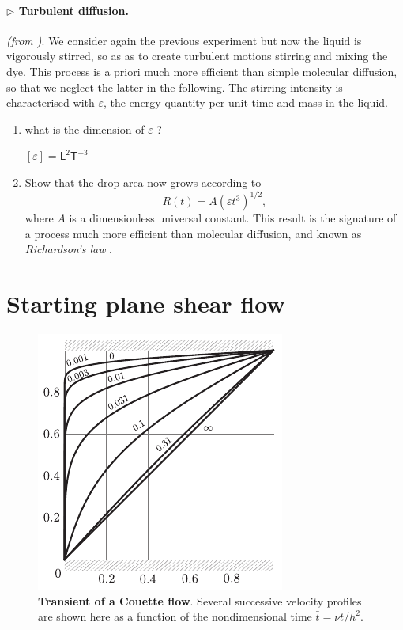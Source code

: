 \documentclass[11pt,a4paper]{article}
\newcommand{\lp}{\left(}
\newcommand{\rp}{\right)}
\begin{document}
\paragraph{$\rhd$ Turbulent diffusion.} \textit{(from \citet{Eggers2015})}. We consider again the previous experiment but now the liquid is vigorously stirred, so as as to create turbulent motions stirring and mixing the dye. This process is a priori much more efficient than simple molecular diffusion, so that we neglect the latter in the following. The stirring intensity is characterised with $\varepsilon$, the energy quantity per unit time and mass in the liquid. 
\begin{enumerate}[resume]
\item what is the dimension of $\varepsilon$ ?
\begin{answer}
$[\varepsilon] = \mathsf{L}^2\mathsf{T}^{-3}$
\end{answer}

\item Show that the drop area now grows according to
\begin{equation}
R(t) = A \lp \varepsilon t^3\rp^{1/2},
\end{equation}
where $A$ is a dimensionless universal constant. This result is the signature of a process much more efficient than molecular diffusion, and known as \textit{Richardson's law} \citep{Richardson1926,Eggers2015}.
\end{enumerate}


\section{Starting plane shear flow}
\begin{figure}[h]
\begin{center}
\includegraphics{transient_couette.pdf}
\end{center}
\caption{\textbf{Transient of a Couette flow}. Several successive velocity profiles are shown here as a function of the nondimensional time $\bar t = \nu t / h^2$.}
\end{figure}
\end{document}
